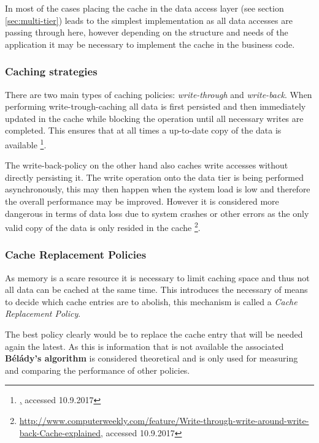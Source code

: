 In most of the cases placing the cache in the data access layer (see section \ref{sec:multi-tier}) leads to the simplest implementation as all data accesses are passing through here, however depending on the structure and needs of the application it may be necessary to implement the cache in the business code.

\subsubsection{Caching strategies}
There are two main types of caching policies: \emph{write-through} and \emph{write-back}. When performing write-trough-caching all data is first persisted and then immediately updated in the cache while blocking the operation until all necessary writes are completed. This ensures that at all times a up-to-date copy of the data is available \footnote{\href{http://searchsolidstatestorage.techtarget.com/answer/Comparing-write-through-write-back-and-write-around-caching}, accessed 10.9.2017}. 

The write-back-policy on the other hand also caches write accesses without directly persisting it. The write operation onto the data tier is being performed asynchronously, this may then happen when the system load is low and therefore the overall performance may be improved. However it is considered more dangerous in terms of data loss due to system crashes or other errors as the only valid copy of the data is only resided in the cache  \footnote{\href{http://www.computerweekly.com/feature/Write-through-write-around-write-back-Cache-explained}{http://www.computerweekly.com/feature/Write-through-write-around-write-back-Cache-explained}, accessed 10.9.2017}.

\subsubsection{Cache Replacement Policies}
As memory is a scare resource it is necessary to limit caching space and thus not all data can be cached at the same time. This introduces the necessary of means to decide which cache entries are to abolish, this mechanism is called a \emph{Cache Replacement Policy}. 

The best policy clearly would be to replace the cache entry that will be needed again the latest. As this is information that is not available the associated \textbf{Bélády's algorithm} is considered theoretical and is only used for measuring and comparing the performance of other policies.

